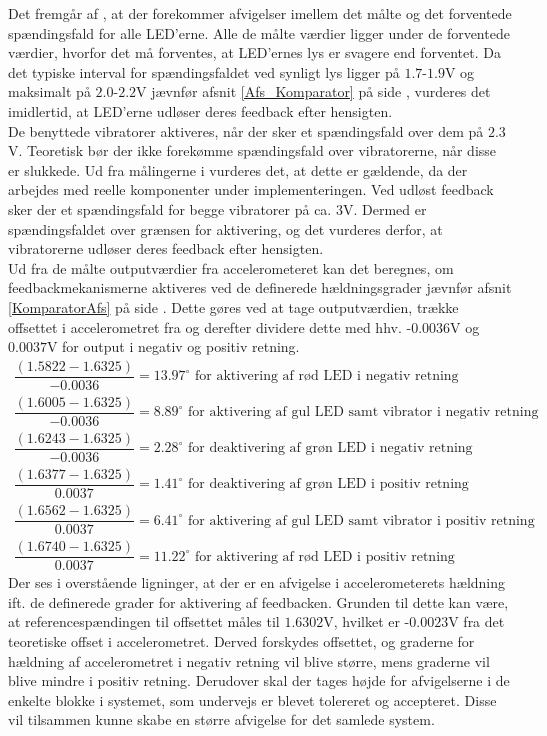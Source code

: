 Det fremgår af , at der forekommer afvigelser imellem det målte og det forventede spændingsfald for alle LED'erne. Alle de målte værdier ligger under de forventede værdier, hvorfor det må forventes, at LED'ernes lys er svagere end forventet. Da det typiske interval for spændingsfaldet ved synligt lys ligger på $1.7$-$1.9$V og maksimalt på $2.0$-$2.2$V jævnfør afsnit \ref{Afs_Komparator} på side \pageref{Afs_Komparator}, vurderes det imidlertid, at LED'erne udløser deres feedback efter hensigten.\\
De benyttede vibratorer aktiveres, når der sker et spændingsfald over dem på $2.3$V. \cite{Machinery2009} Teoretisk bør der ikke forekømme spændingsfald over vibratorerne, når disse er slukkede. Ud fra målingerne i  vurderes det, at dette er gældende, da der arbejdes med reelle komponenter under implementeringen. Ved udløst feedback sker der et spændingsfald for begge vibratorer på ca. $3$V. Dermed er spændingsfaldet over grænsen for aktivering, og det vurderes derfor, at vibratorerne udløser deres feedback efter hensigten. \\
Ud fra de målte outputværdier fra accelerometeret kan det beregnes, om feedbackmekanismerne aktiveres ved de definerede hældningsgrader jævnfør afsnit \ref{KomparatorAfs} på side \pageref{KomparatorAfs}. Dette gøres ved at tage outputværdien, trække offsettet i accelerometret fra og derefter dividere dette med hhv. -$0.0036$V og $0.0037$V for output i negativ og positiv retning.
\begin{align}\label{eq:graderLED_1}
\dfrac{(1.5822 - 1.6325)}{-0.0036} = 13.97^{\circ}\text{ for aktivering af rød LED i negativ retning} \\
\dfrac{(1.6005 - 1.6325)}{-0.0036} = 8.89^{\circ}\text{ for aktivering af gul LED samt vibrator i negativ retning} \\
\dfrac{(1.6243 - 1.6325)}{-0.0036} = 2.28^{\circ}\text{ for deaktivering af grøn LED i negativ retning} \\
\dfrac{(1.6377 - 1.6325)}{0.0037} = 1.41^{\circ}\text{ for deaktivering af grøn LED i positiv retning} \\
\dfrac{(1.6562 - 1.6325)}{0.0037} = 6.41^{\circ}\text{ for aktivering af gul LED samt vibrator i positiv retning} \\ \label{eq:graderLED_2}
\dfrac{(1.6740 - 1.6325)}{0.0037} = 11.22^{\circ}\text{ for aktivering af rød LED i positiv retning}
\end{align}
\noindent Der ses i overstående ligninger, at der er en afvigelse i accelerometerets hældning ift. de definerede grader for aktivering af feedbacken. Grunden til dette kan være, at referencespændingen til offsettet måles til $1.6302$V, hvilket er -$0.0023$V fra det teoretiske offset i accelerometret. Derved forskydes offsettet, og graderne for hældning af accelerometret i negativ retning vil blive større, mens graderne vil blive mindre i positiv retning. Derudover skal der tages højde for afvigelserne i de enkelte blokke i systemet, som undervejs er blevet tolereret og accepteret. Disse vil tilsammen kunne skabe en større afvigelse for det samlede system. \\
